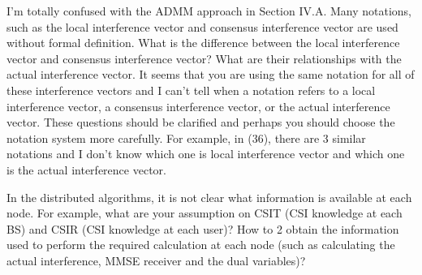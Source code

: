 \begin{enumerate}
 I’m totally confused with the ADMM approach in Section IV.A. Many notations, such as the local interference vector and consensus interference vector are used without formal definition. What is the difference between the local interference vector and consensus interference vector? What are their relationships with the actual interference vector. It seems that you are using the same notation for all of these interference vectors and I can’t tell when a notation refers to a local interference vector, a consensus interference vector, or the actual interference vector. These questions should be clarified and perhaps you should choose the notation system more carefully. For example, in (36), there are 3 similar notations and I don’t know which one is local interference vector and which one is the actual interference vector.

\resp {}

 In the distributed algorithms, it is not clear what information is available at each node. For example, what are your assumption on CSIT (CSI knowledge at each BS) and CSIR (CSI knowledge at each user)? How to 2 obtain the information used to perform the required calculation at each node (such as calculating the actual interference, MMSE receiver and the dual variables)?


\end{enumerate}
